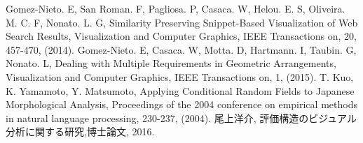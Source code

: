 \documentclass[syuuron]{kuee}
\begin{document}
\begin{thebibliography}{数字}
	 Gomez-Nieto. E, San Roman. F, Pagliosa. P, Casaca. W, Helou. E. S, Oliveira. M. C. F, Nonato. L. G, Similarity Preserving Snippet-Based Visualization of Web Search Results, Visualization and Computer Graphics, IEEE Transactions on, 20, 457-470, (2014).
	 Gomez-Nieto. E, Casaca. W, Motta. D, Hartmann. I, Taubin. G, Nonato. L, Dealing with Multiple Requirements in Geometric Arrangements, Visualization and Computer Graphics, IEEE Transactions on, 1, (2015).
	 T. Kuo, K. Yamamoto, Y. Matsumoto, Applying Conditional Random Fields to Japanese Morphological Analysis, Proceedings of the 2004 conference on empirical methods in natural language processing, 230-237, (2004).
	 尾上洋介, 評価構造のビジュアル分析に関する研究,博士論文, 2016.
\end{thebibliography}

\appendix
\end{document}
